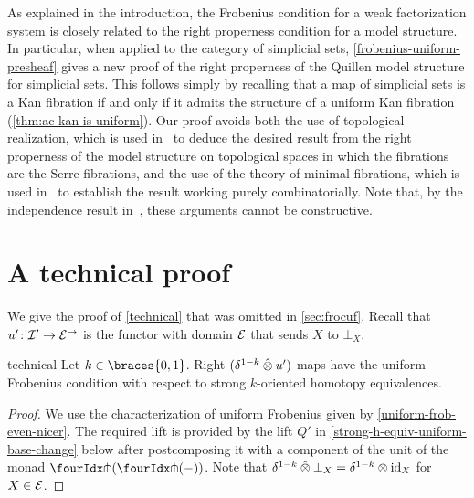 \documentclass[reqno,10pt,a4paper,oneside,draft]{amsart}
\begin{document}
\begin{remark}
As explained in the introduction, the Frobenius condition for a weak factorization system is closely related to the right properness condition for a model structure. In particular, when applied to the category of simplicial sets, \cref{frobenius-uniform-presheaf} gives a new
proof of the right properness of the Quillen model structure for simplicial sets. This follows
simply by recalling that a map of simplicial sets is a Kan fibration if and only if it admits
the structure of a uniform Kan fibration (\cref{thm:ac-kan-is-uniform}). 
Our proof avoids both the use of topological realization, which is used 
in~\cite[Theorem~13.1.13]{hirschhorn-model-localizations} to deduce
the desired result from the right properness of the model structure on topological spaces in which the fibrations are the Serre fibrations, and the use of the theory of minimal fibrations,
which is used in~\cite[Theorem~1.7.1]{joyal-tierney-notes} to establish the result 
working purely combinatorially. Note that, by the independence result in~\cite{coquand-non-constructivity-kan}, these arguments cannot be constructive.
\end{remark}


\appendix

\section{A technical proof}
\label{app:tecp}

We give the proof of \cref{technical} that was omitted in \cref{sec:frocuf}.
Recall that $u' \co \cal{I}' \to \cal{E}^\to$ is the functor with domain $\cal{E}$ that sends $X$ to $\bot_X$.

\begin{replemma}{technical}
Let $k \in \braces{0, 1}$.
Right $(\delta^{1-k} \hatotimes u')$-maps have the uniform Frobenius condition with respect to strong $k$-oriented homotopy equivalences.
\end{replemma}

\begin{proof}
We use the characterization of uniform Frobenius given by \cref{uniform-frob-even-nicer}.
The required lift is provided by the lift $Q'$ in \cref{strong-h-equiv-uniform-base-change} below after postcomposing it with a component of the unit of the monad $\liftl{(\liftr{(-)})}$.
Note that $\delta^{1-k} \hatotimes \bot_X = \delta^{1-k} \otimes \id_X$ for $X \in \cal{E}$.
\end{proof}
\end{document}
